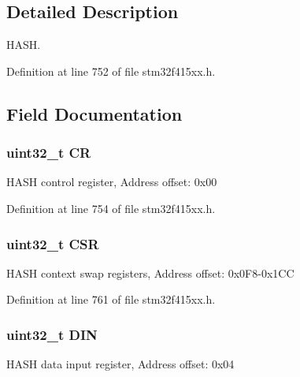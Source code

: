 \subsection{Detailed Description}
H\+A\+SH. 

Definition at line 752 of file stm32f415xx.\+h.



\subsection{Field Documentation}
\subsubsection[{\texorpdfstring{CR}{CR}}]{ uint32\+\_\+t CR}\hypertarget{struct_h_a_s_h___type_def_ab40c89c59391aaa9d9a8ec011dd0907a}{}\label{struct_h_a_s_h___type_def_ab40c89c59391aaa9d9a8ec011dd0907a}
H\+A\+SH control register, Address offset\+: 0x00 

Definition at line 754 of file stm32f415xx.\+h.

\subsubsection[{\texorpdfstring{C\+SR}{CSR}}]{ uint32\+\_\+t C\+SR}\hypertarget{struct_h_a_s_h___type_def_aff58fd9be043a6ce455a6829d2725007}{}\label{struct_h_a_s_h___type_def_aff58fd9be043a6ce455a6829d2725007}
H\+A\+SH context swap registers, Address offset\+: 0x0\+F8-\/0x1\+CC 

Definition at line 761 of file stm32f415xx.\+h.

\subsubsection[{\texorpdfstring{D\+IN}{DIN}}]{ uint32\+\_\+t D\+IN}\hypertarget{struct_h_a_s_h___type_def_a445dd5529e7dc6a4fa2fec4f78da2692}{}\label{struct_h_a_s_h___type_def_a445dd5529e7dc6a4fa2fec4f78da2692}
H\+A\+SH data input register, Address offset\+: 0x04 

